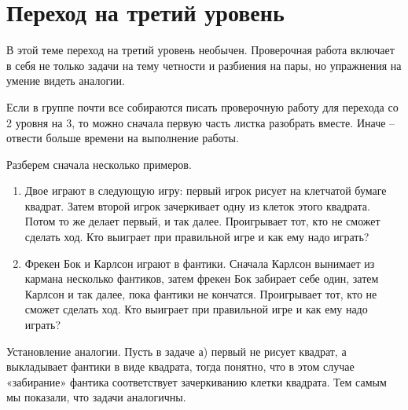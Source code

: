 \section{Переход на третий  уровень}

В этой теме переход на третий уровень необычен. Проверочная работа включает в себя не только задачи на тему четности и разбиения на пары, но упражнения на умение видеть аналогии.

Если в группе почти все собираются писать проверочную работу для перехода со 2 уровня на 3, то можно сначала первую часть листка разобрать вместе. Иначе -- отвести больше времени на выполнение работы.

Разберем сначала несколько примеров.

\begin{enumerate}
	\item  Двое играют в следующую игру: первый игрок рисует на клетчатой бумаге квадрат. Затем второй игрок зачеркивает одну из клеток этого квадрата. Потом то же делает первый, и так далее. Проигрывает тот, кто не сможет сделать ход. Кто выиграет при правильной игре и как ему надо играть?
	
	\item  Фрекен Бок и Карлсон играют в фантики. Сначала Карлсон вынимает из кармана несколько фантиков, затем фрекен Бок забирает себе один, затем Карлсон и так далее, пока фантики не кончатся. Проигрывает тот, кто не сможет сделать ход. Кто выиграет при правильной игре и как ему надо играть?
\end{enumerate}

Установление аналогии. Пусть в задаче а) первый не рисует квадрат, а выкладывает фантики в виде квадрата, тогда понятно, что в этом случае «забирание» фантика соответствует зачеркиванию клетки квадрата. Тем самым мы показали, что задачи аналогичны.

